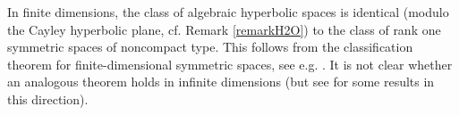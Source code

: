 \begin{remark}
\label{remarkROSSONCTterminology}
In finite dimensions, the class of algebraic hyperbolic spaces is identical (modulo the Cayley hyperbolic plane, cf. Remark \ref{remarkH2O}) to the class of rank one symmetric spaces of noncompact type. This follows from the classification theorem for finite-dimensional symmetric spaces, see e.g. \cite[p.518]{Helgason}. It is not clear whether an analogous theorem holds in infinite dimensions (but see \cite{Duchesne3} for some results in this direction).
\end{remark}

%

